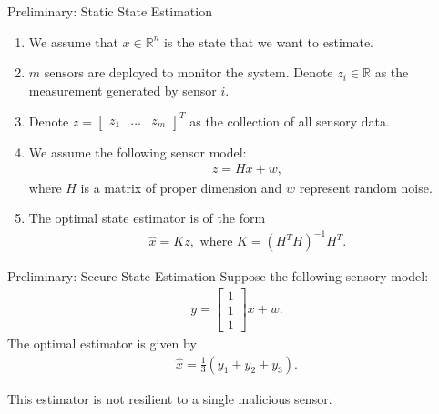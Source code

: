 \documentclass[10pt]{beamer}
\begin{document}
\begin{frame}{Preliminary: Static State Estimation}
  \begin{enumerate}
  \item We assume that $x \in \mathbb R^n$ is the state that we want to estimate.
  \item $m$ sensors are deployed to monitor the system. Denote $z_i \in \mathbb R$ as the measurement generated by sensor $i$.
  \item Denote $z = \begin{bmatrix}z_1&\dots&z_m\end{bmatrix}^T$ as the collection of all sensory data.
  \item We assume the following sensor model:
    \begin{align*}
      z = Hx + w,
    \end{align*}
    where $H$ is a matrix of proper dimension and $w$ represent random noise.
  \item The optimal state estimator is of the form
    \begin{align*}
      \hat x = Kz, \text{ where }K = (H^TH)^{-1}H^T.
    \end{align*}
  \end{enumerate}
\end{frame}

\begin{frame}{Preliminary: Secure State Estimation}
  Suppose the following sensory model:
  \begin{align*}
    y = \begin{bmatrix}
      1\\
      1\\
      1
    \end{bmatrix}x + w.
  \end{align*}
  The optimal estimator is given by
  \begin{align*}
    \hat x = \frac{1}{3}\left(y_1+y_2+y_3\right).
  \end{align*}
  
  This estimator is not resilient to a single malicious sensor.
\end{frame}
\end{document}
